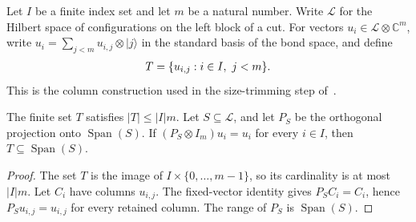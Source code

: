 \begin{definition}
    \label{def:lvv_finite_left_columns}
    \leanok
    Let $I$ be a finite index set and let $m$ be a natural number. Write
    $\mathcal L$ for the Hilbert space of configurations on the left block
    of a cut. For vectors $u_i\in\mathcal L\otimes\mathbb C^m$, write
    $u_i=\sum_{j<m}u_{i,j}\otimes|j\rangle$ in the standard basis of the
    bond space, and define
    \begin{align}
        T=\{u_{i,j}:i\in I,\ j<m\}.\notag
    \end{align}
    This is the column construction used in the size-trimming step
    of~\cite[Claim~2.7, source lines 472--477 and 520--527]{Landau2015Polynomial}.
\end{definition}

\begin{lemma}
    \label{thm:lvv_finite_left_columns}
    \leanok
    The finite set $T$ satisfies $|T|\le |I|m$.
    Let $S\subseteq\mathcal L$, and let $P_S$ be the orthogonal projection
    onto $\operatorname{Span}(S)$. If $(P_S\otimes I_m)u_i=u_i$ for every
    $i\in I$, then $T\subseteq\operatorname{Span}(S)$.
\end{lemma}
\begin{proof}\leanok
    The set $T$ is the image of $I\times\{0,\ldots,m-1\}$, so its cardinality
    is at most $|I|m$. Let $C_i$ have columns $u_{i,j}$. The fixed-vector
    identity gives $P_SC_i=C_i$, hence $P_Su_{i,j}=u_{i,j}$ for every
    retained column. The range of $P_S$ is $\operatorname{Span}(S)$.
\end{proof}


